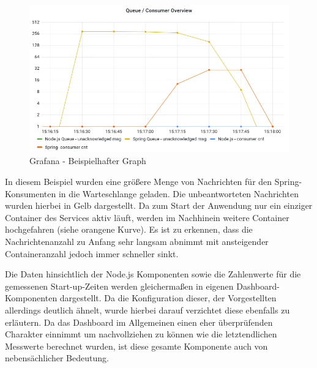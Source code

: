 \begin{figure}
	\centering
	\includegraphics[width=.8\linewidth]{kapitel/problemloesung/implementierung/_img/grafana-graphExample}
	\caption[]{Grafana - Beispielhafter Graph}
	\label{fig:graphEx}
\end{figure}

In diesem Beispiel wurden eine größere Menge von Nachrichten für den Spring-Konsumenten in die Warteschlange geladen. Die unbeantworteten Nachrichten wurden hierbei in Gelb dargestellt. Da zum Start der Anwendung nur ein einziger Container des Services aktiv läuft, werden im Nachhinein weitere Container hochgefahren (siehe orangene Kurve). Es ist zu erkennen, dass die Nachrichtenanzahl zu Anfang sehr langsam abnimmt mit ansteigender Containeranzahl jedoch immer schneller sinkt.

Die Daten hinsichtlich der Node.js Komponenten sowie die Zahlenwerte für die gemessenen Start-up-Zeiten werden gleichermaßen in eigenen Dashboard-Komponenten dargestellt. Da die Konfiguration dieser, der Vorgestellten allerdings deutlich ähnelt, wurde hierbei darauf verzichtet diese ebenfalls zu erläutern. Da das Dashboard im Allgemeinen einen eher überprüfenden Charakter einnimmt um nachvollziehen zu können wie die letztendlichen Messwerte berechnet wurden, ist diese gesamte Komponente auch von nebensächlicher Bedeutung.





